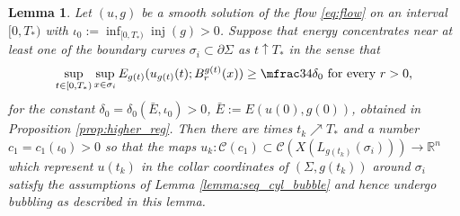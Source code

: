 \documentclass[10pt,reqno]{amsart}
\theoremstyle{plain}
\newtheorem{lemma}{Lemma}[section]
\theoremstyle{definition}
\numberwithin{equation}{section}
\newcommand{\de}{\delta}
\newcommand{\si}{\sigma}
\newcommand{\Si}{\Sigma}
\newcommand{\R}{\ensuremath{{\mathbb R}}}
\newcommand{\upto}{\uparrow}
\DeclareMathOperator{\inj}{inj}
\newcommand{\beq}{\begin{equation}}
\newcommand{\eeq}{\end{equation}}
\newcommand{\Cyl}{{\mathscr{C}}}
\newcommand{\pSi}{{\partial \Sigma}}
\begin{document}
\begin{lemma}\label{lemma:flow_bubble}
    Let $(u,g)$ be a smooth solution of the flow \eqref{eq:flow} on an interval $[0,T_*)$ with $\iota_0:=\inf_{[0,T_*)}\inj(g)>0$. Suppose that energy concentrates near at least one of the boundary curves $\si_i\subset \pSi$ as $t\upto T_*$ in the sense that 
    \beq\label{ass:energy-conc-lemma}
        \sup_{t\in [0,T_*)}\sup_{x\in \si_i} E_{g(t)}(u_{g(t)}(t);B_{r}^{g(t)}(x)) \geq \mfrac34\de_0 \text{ for every } r>0,
    \eeq
    for the constant $\de_0=\de_0(\bar E, \iota_0)>0$, $\bar E:= E(u(0),g(0))$, obtained in Proposition  \ref{prop:higher_reg}. Then there are times  $t_k \nearrow T_*$ and a number $c_1=c_1(\iota_0)>0$ so that the maps $u_k:\Cyl(c_1)\subset \Cyl(X(L_{g(t_k)}(\si_i)))\to \R^n$ which represent $u(t_k)$ in the collar coordinates of $(\Si,g(t_k))$ around $\si_i$ satisfy the assumptions of Lemma \ref{lemma:seq_cyl_bubble} and hence undergo bubbling as described in this lemma. 
\end{lemma}
\end{document}
